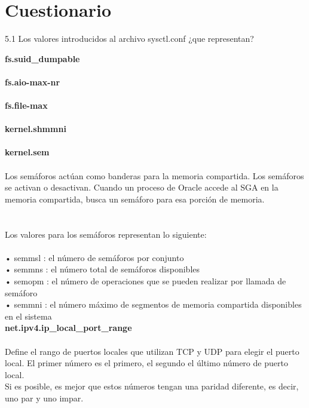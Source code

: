 \section{Cuestionario} 
\vspace{\baselineskip}
5.1 Los valores introducidos al archivo sysctl.conf ¿que representan?

\vspace{\baselineskip}

{\bfseries fs.suid\_dumpable}
\\
\\

{\bfseries fs.aio-max-nr}
\\
\\

{\bfseries fs.file-max}
\\
\\

{\bfseries kernel.shmmni}
\\
\\

{\bfseries  kernel.sem}
\\
\\Los semáforos actúan como banderas para la memoria compartida. Los semáforos se activan o desactivan. Cuando un proceso de Oracle accede al SGA en la memoria compartida, busca un semáforo para esa porción de memoria. \\
\\
\\Los valores para los semáforos representan lo siguiente:\\
\\•	semmsl : el número de semáforos por conjunto
\\•	semmns : el número total de semáforos disponibles
\\•	semopm : el número de operaciones que se pueden realizar por llamada de semáforo
\\•	semmni : el número máximo de segmentos de memoria compartida disponibles en el sistema
\\

{\bfseries  net.ipv4.ip\_local\_port\_range}
\\
\\Define el rango de puertos locales que utilizan TCP y UDP para elegir el puerto local. El primer número es el primero, el segundo el último número de puerto local. 
\\Si es posible, es mejor que estos números tengan una paridad diferente, es decir, uno par y uno impar. 
\\

